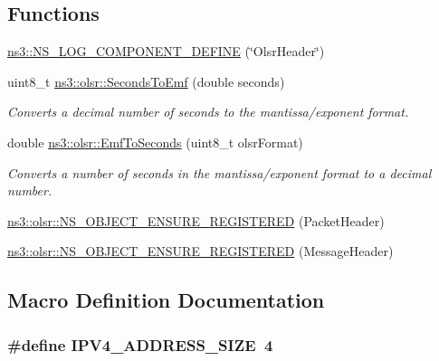 \subsection*{Functions}
\begin{DoxyCompactItemize}
\item 
\hyperlink{namespacens3_a9f10d14ab407e16ade0a89cd411a0166}{ns3\+::\+N\+S\+\_\+\+L\+O\+G\+\_\+\+C\+O\+M\+P\+O\+N\+E\+N\+T\+\_\+\+D\+E\+F\+I\+NE} (\char`\"{}Olsr\+Header\char`\"{})
\item 
uint8\+\_\+t \hyperlink{namespacens3_1_1olsr_aa544b806b38a4a63280ce21a9b706628}{ns3\+::olsr\+::\+Seconds\+To\+Emf} (double seconds)
\begin{DoxyCompactList}\small\item\em Converts a decimal number of seconds to the mantissa/exponent format. \end{DoxyCompactList}\item 
double \hyperlink{namespacens3_1_1olsr_a6d7d7cac3867eec9f70686ab69f1ded6}{ns3\+::olsr\+::\+Emf\+To\+Seconds} (uint8\+\_\+t olsr\+Format)
\begin{DoxyCompactList}\small\item\em Converts a number of seconds in the mantissa/exponent format to a decimal number. \end{DoxyCompactList}\item 
\hyperlink{namespacens3_1_1olsr_a8ab14d3afb0e0ca3b550d000562d49c3}{ns3\+::olsr\+::\+N\+S\+\_\+\+O\+B\+J\+E\+C\+T\+\_\+\+E\+N\+S\+U\+R\+E\+\_\+\+R\+E\+G\+I\+S\+T\+E\+R\+ED} (Packet\+Header)
\item 
\hyperlink{namespacens3_1_1olsr_a3225239f668cbd69876b19cad79fa439}{ns3\+::olsr\+::\+N\+S\+\_\+\+O\+B\+J\+E\+C\+T\+\_\+\+E\+N\+S\+U\+R\+E\+\_\+\+R\+E\+G\+I\+S\+T\+E\+R\+ED} (Message\+Header)
\end{DoxyCompactItemize}


\subsection{Macro Definition Documentation}
\subsubsection[{\texorpdfstring{I\+P\+V4\+\_\+\+A\+D\+D\+R\+E\+S\+S\+\_\+\+S\+I\+ZE}{IPV4_ADDRESS_SIZE}}]{\setlength{\rightskip}{0pt plus 5cm}\#define I\+P\+V4\+\_\+\+A\+D\+D\+R\+E\+S\+S\+\_\+\+S\+I\+ZE~4}\hypertarget{olsr-header_8cc_a78eabd4fb6c036f7de9b598066b3c39e}{}\label{olsr-header_8cc_a78eabd4fb6c036f7de9b598066b3c39e}
